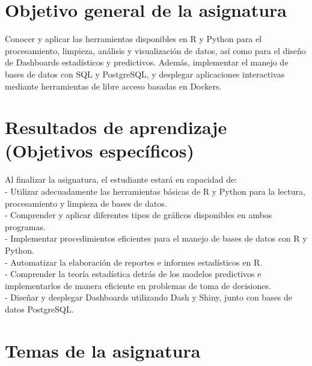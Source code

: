 \documentclass[
]{book}
\begin{document}
\section*{Objetivo general de la asignatura}\label{objetivo-general-de-la-asignatura}

Conocer y aplicar las herramientas disponibles en R y Python para el procesamiento, limpieza, análisis y visualización de datos, así como para el diseño de Dashboards estadísticos y predictivos. Además, implementar el manejo de bases de datos con SQL y PostgreSQL, y desplegar aplicaciones interactivas mediante herramientas de libre acceso basadas en Dockers.

\section*{Resultados de aprendizaje (Objetivos específicos)}\label{resultados-de-aprendizaje-objetivos-especuxedficos}

Al finalizar la asignatura, el estudiante estará en capacidad de:\\
- Utilizar adecuadamente las herramientas básicas de R y Python para la lectura, procesamiento y limpieza de bases de datos.\\
- Comprender y aplicar diferentes tipos de gráficos disponibles en ambos programas.\\
- Implementar procedimientos eficientes para el manejo de bases de datos con R y Python.\\
- Automatizar la elaboración de reportes e informes estadísticos en R.\\
- Comprender la teoría estadística detrás de los modelos predictivos e implementarlos de manera eficiente en problemas de toma de decisiones.\\
- Diseñar y desplegar Dashboards utilizando Dash y Shiny, junto con bases de datos PostgreSQL.

\section*{Temas de la asignatura}\label{temas-de-la-asignatura}
\end{document}

